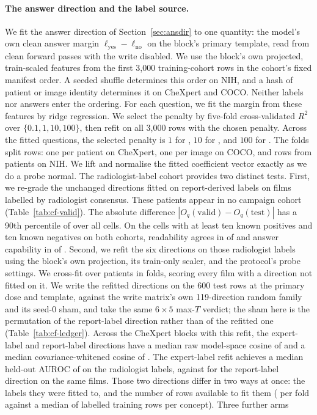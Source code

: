 \documentclass{article}
\begin{document}
\paragraph{The answer direction and the label source.} We fit the answer direction of Section~\ref{sec:ansdir} to one quantity: the model's own clean answer margin $\ell_{\mathrm{yes}}-\ell_{\mathrm{no}}$ on the block's primary template, read from clean forward passes with the write disabled. We use the block's own projected, train-scaled features from the first 3{,}000 training-cohort rows in the cohort's fixed manifest order. A seeded shuffle determines this order on NIH, and a hash of patient or image identity determines it on CheXpert and COCO. Neither labels nor answers enter the ordering. For each question, we fit the margin from these features by ridge regression. We select the penalty by five-fold cross-validated $R^2$ over $\{0.1,1,10,100\}$, then refit on all 3{,}000 rows with the chosen penalty. Across the \cfAnsAlphaCells{} fitted questions, the selected penalty is $1$ for \cfAnsAlphaOne{}, $10$ for \cfAnsAlphaTen{}, and $100$ for \cfAnsAlphaHundred{}. The folds split rows: one per patient on CheXpert, one per image on COCO, and rows from \cfAnsTrainUnitsNih{} patients on NIH. We lift and normalise the fitted coefficient vector exactly as we do a probe normal. The radiologist-label cohort provides two distinct tests. First, we re-grade the unchanged directions fitted on report-derived labels on \cfValidRows{} films labelled by radiologist consensus. These patients appear in no campaign cohort (Table~\ref{tab:cf-valid}). The absolute difference $|O_q(\text{valid})-O_q(\text{test})|$ has a 90th percentile of \cfValidNinetyDO{} over all cells. On the \cfValidSupported{} cells with at least ten known positives and ten known negatives on both cohorts, readability agrees in \cfValidReadableAgree{} of \cfValidReadableN{} and answer capability in \cfValidAnswerAgree{} of \cfValidAnswerN{}. Second, we refit the six directions on those radiologist labels using the block's own projection, its train-only scaler, and the protocol's probe settings. We cross-fit over patients in \cfValidfitFolds{} folds, scoring every film with a direction not fitted on it. We write the refitted directions on the 600 test rows at the primary dose and template, against the write matrix's own 119-direction random family and its seed-0 sham, and take the same $6\times5$ max-$T$ verdict; the sham here is the permutation of the report-label direction rather than of the refitted one (Table~\ref{tab:cf-ledger}). Across the \cfValidfitBlocks{} CheXpert blocks with this refit, the expert-label and report-label directions have a median raw model-space cosine of \cfValidfitCosRaw{} and a median covariance-whitened cosine of \cfValidfitCosWhitened{}. The expert-label refit achieves a median held-out AUROC of \cfValidfitAurocExpert{} on the radiologist labels, against \cfValidfitAurocReportDir{} for the report-label direction on the same films. Those two directions differ in two ways at once: the labels they were fitted to, and the number of rows available to fit them (\cfVfArmExpertRows{} per fold against a median of \cfVfArmReportFullRows{} labelled training rows per concept). Three further arms 
\end{document}
